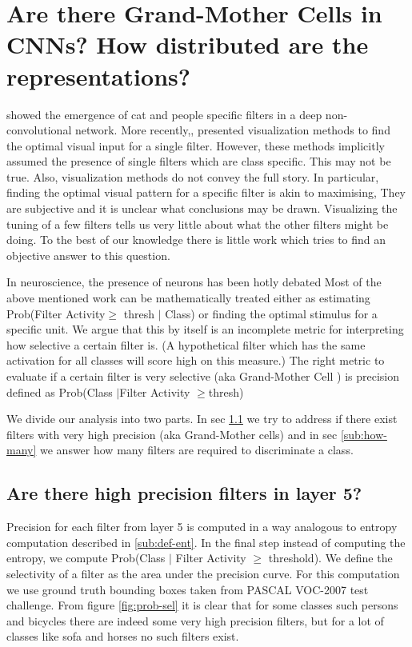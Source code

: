 
\section{Are there Grand-Mother Cells in CNNs? How distributed are the representations?}
\label{sec:grand-mother}
 

\cite{GoogleCat} showed the emergence of cat and people specific filters in a deep non-convolutional network. More recently,\cite{DeConv}, \cite{Simonyan} presented visualization methods to find the optimal visual input for a single filter. However, these methods implicitly assumed the presence of single filters which are class specific. This may not be true. Also, visualization methods do not convey the full story. In particular, finding the  optimal visual pattern for a specific filter is akin to maximising,  They are subjective and it is unclear what conclusions may be drawn. Visualizing the tuning of a few filters tells us very little about what the other filters might be doing. To the best of our knowledge there is little work which tries to find an objective answer to this question.

In neuroscience, the presence of neurons  has been hotly debated Most of the above mentioned work can be mathematically treated either as estimating Prob(Filter Activity$\geq$ thresh $|$ Class) or finding the optimal stimulus for a specific unit. We argue that this by itself is an incomplete metric for interpreting how selective a certain filter is. (A hypothetical filter which has the same activation for all classes will score high on this measure.)  The right metric to evaluate if a certain filter is very selective (aka Grand-Mother Cell \cite{Barlow}) is precision defined as Prob(Class $|$Filter Activity $\geq$thresh)

We divide our analysis into two parts. In sec \ref{sub:class-specific-unit} we try to address if there exist filters with very high precision (aka Grand-Mother cells) and in sec \ref{sub:how-many} we answer how many filters are required to discriminate a class. 

\subsection{Are there high precision filters in layer 5?}
\label{sub:class-specific-unit}
Precision for each filter from layer 5 is computed in a way analogous to entropy computation described in \ref{sub:def-ent}. In the final step instead of computing the entropy, we compute Prob(Class $|$ Filter Activity $\geq$ threshold). We define the selectivity of a filter as the area under the precision curve. For this computation we use ground truth bounding boxes taken from PASCAL VOC-2007 test challenge.
From figure \ref{fig:prob-sel} it is clear that for some classes such persons and bicycles there are indeed some very high precision filters, but for a lot of classes like sofa and horses no such filters exist. 

